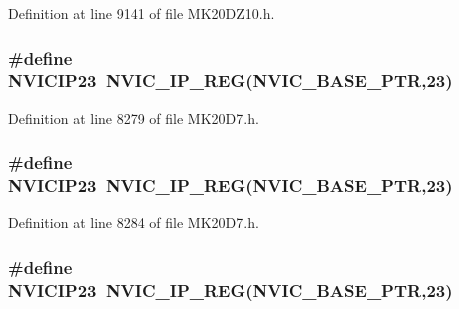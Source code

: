 Definition at line 9141 of file M\+K20\+D\+Z10.\+h.

\subsubsection[{\texorpdfstring{N\+V\+I\+C\+I\+P23}{NVICIP23}}]{\setlength{\rightskip}{0pt plus 5cm}\#define N\+V\+I\+C\+I\+P23~{\bf N\+V\+I\+C\+\_\+\+I\+P\+\_\+\+R\+EG}({\bf N\+V\+I\+C\+\_\+\+B\+A\+S\+E\+\_\+\+P\+TR},23)}\hypertarget{group___n_v_i_c___register___accessor___macros_ga01ca49ae823c9524d002c2e0033ff1ae}{}\label{group___n_v_i_c___register___accessor___macros_ga01ca49ae823c9524d002c2e0033ff1ae}


Definition at line 8279 of file M\+K20\+D7.\+h.

\subsubsection[{\texorpdfstring{N\+V\+I\+C\+I\+P23}{NVICIP23}}]{\setlength{\rightskip}{0pt plus 5cm}\#define N\+V\+I\+C\+I\+P23~{\bf N\+V\+I\+C\+\_\+\+I\+P\+\_\+\+R\+EG}({\bf N\+V\+I\+C\+\_\+\+B\+A\+S\+E\+\_\+\+P\+TR},23)}\hypertarget{group___n_v_i_c___register___accessor___macros_ga01ca49ae823c9524d002c2e0033ff1ae}{}\label{group___n_v_i_c___register___accessor___macros_ga01ca49ae823c9524d002c2e0033ff1ae}


Definition at line 8284 of file M\+K20\+D7.\+h.

\subsubsection[{\texorpdfstring{N\+V\+I\+C\+I\+P23}{NVICIP23}}]{\setlength{\rightskip}{0pt plus 5cm}\#define N\+V\+I\+C\+I\+P23~{\bf N\+V\+I\+C\+\_\+\+I\+P\+\_\+\+R\+EG}({\bf N\+V\+I\+C\+\_\+\+B\+A\+S\+E\+\_\+\+P\+TR},23)}\hypertarget{group___n_v_i_c___register___accessor___macros_ga01ca49ae823c9524d002c2e0033ff1ae}{}\label{group___n_v_i_c___register___accessor___macros_ga01ca49ae823c9524d002c2e0033ff1ae}



